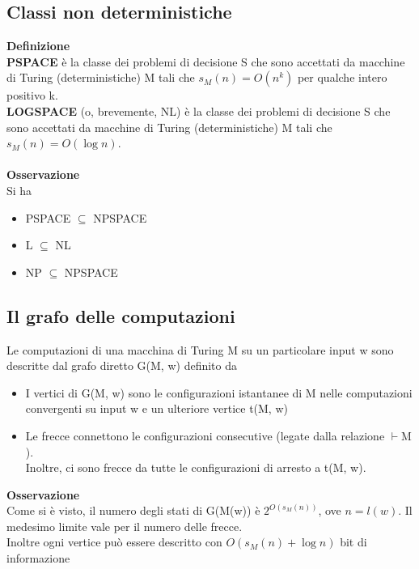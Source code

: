 \subsection{Classi non deterministiche}
\textbf{Definizione}\\
\textbf{PSPACE} è la classe dei problemi di decisione S che sono accettati da
macchine di Turing (deterministiche) M tali che $s_M(n) = O(n^k)$ per qualche intero positivo k.
\\\textbf{LOGSPACE} (o, brevemente, NL) è la classe dei problemi di decisione S che sono accettati da macchine di Turing (deterministiche) M tali che $s_M(n) = O(\log n).$\\\\
\textbf{Osservazione}\\
Si ha
\begin{itemize}
    \item PSPACE $\subseteq$ NPSPACE
    \item L $\subseteq$ NL
    \item NP $\subseteq$ NPSPACE
\end{itemize}
\subsection{Il grafo delle computazioni}
Le computazioni di una macchina di Turing M su un particolare input w
sono descritte dal grafo diretto G(M, w) definito da
\begin{itemize}
    \item I vertici di G(M, w) sono le configurazioni istantanee di M nelle computazioni convergenti su input w e un ulteriore vertice t(M, w)
    \item Le frecce connettono le configurazioni consecutive (legate dalla relazione $\vdash$M ). 
\\Inoltre, ci sono frecce da tutte le configurazioni di arresto a t(M, w).
\end{itemize}
\textbf{Osservazione}\\
Come si è visto, il numero degli stati di G(M(w)) è $2^{O(s_M(n))}$, ove $n=l(w)$.
Il medesimo limite vale per il numero delle frecce.
\\Inoltre ogni vertice può essere descritto con $O(s_M (n) + \log n)$ bit di
informazione